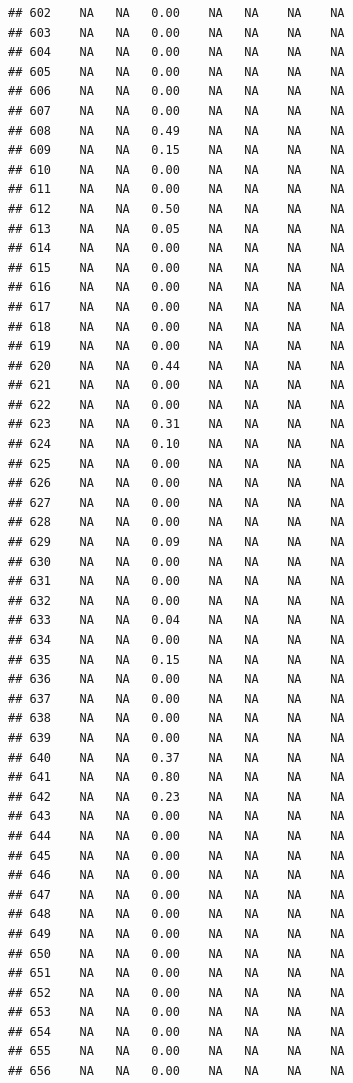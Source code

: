 \documentclass{article}\usepackage{graphicx, color}
\makeatletter
\newenvironment{kframe}{%
 \def\at@end@of@kframe{}%
 \ifinner\ifhmode%
  \def\at@end@of@kframe{\end{minipage}}%
  \begin{minipage}{\columnwidth}%
 \fi\fi%
 \def\FrameCommand##1{\hskip\@totalleftmargin \hskip-\fboxsep
 \colorbox{shadecolor}{##1}\hskip-\fboxsep
     \hskip-\linewidth \hskip-\@totalleftmargin \hskip\columnwidth}%
 \MakeFramed {\advance\hsize-\width
   \@totalleftmargin\z@ \linewidth\hsize
   \@setminipage}}%
 {\par\unskip\endMakeFramed%
 \at@end@of@kframe}
\newenvironment{knitrout}{}{} %
\makeatother
\begin{document}
\begin{knitrout}
\begin{kframe}
\begin{verbatim}
## 602    NA   NA   0.00    NA   NA    NA    NA
## 603    NA   NA   0.00    NA   NA    NA    NA
## 604    NA   NA   0.00    NA   NA    NA    NA
## 605    NA   NA   0.00    NA   NA    NA    NA
## 606    NA   NA   0.00    NA   NA    NA    NA
## 607    NA   NA   0.00    NA   NA    NA    NA
## 608    NA   NA   0.49    NA   NA    NA    NA
## 609    NA   NA   0.15    NA   NA    NA    NA
## 610    NA   NA   0.00    NA   NA    NA    NA
## 611    NA   NA   0.00    NA   NA    NA    NA
## 612    NA   NA   0.50    NA   NA    NA    NA
## 613    NA   NA   0.05    NA   NA    NA    NA
## 614    NA   NA   0.00    NA   NA    NA    NA
## 615    NA   NA   0.00    NA   NA    NA    NA
## 616    NA   NA   0.00    NA   NA    NA    NA
## 617    NA   NA   0.00    NA   NA    NA    NA
## 618    NA   NA   0.00    NA   NA    NA    NA
## 619    NA   NA   0.00    NA   NA    NA    NA
## 620    NA   NA   0.44    NA   NA    NA    NA
## 621    NA   NA   0.00    NA   NA    NA    NA
## 622    NA   NA   0.00    NA   NA    NA    NA
## 623    NA   NA   0.31    NA   NA    NA    NA
## 624    NA   NA   0.10    NA   NA    NA    NA
## 625    NA   NA   0.00    NA   NA    NA    NA
## 626    NA   NA   0.00    NA   NA    NA    NA
## 627    NA   NA   0.00    NA   NA    NA    NA
## 628    NA   NA   0.00    NA   NA    NA    NA
## 629    NA   NA   0.09    NA   NA    NA    NA
## 630    NA   NA   0.00    NA   NA    NA    NA
## 631    NA   NA   0.00    NA   NA    NA    NA
## 632    NA   NA   0.00    NA   NA    NA    NA
## 633    NA   NA   0.04    NA   NA    NA    NA
## 634    NA   NA   0.00    NA   NA    NA    NA
## 635    NA   NA   0.15    NA   NA    NA    NA
## 636    NA   NA   0.00    NA   NA    NA    NA
## 637    NA   NA   0.00    NA   NA    NA    NA
## 638    NA   NA   0.00    NA   NA    NA    NA
## 639    NA   NA   0.00    NA   NA    NA    NA
## 640    NA   NA   0.37    NA   NA    NA    NA
## 641    NA   NA   0.80    NA   NA    NA    NA
## 642    NA   NA   0.23    NA   NA    NA    NA
## 643    NA   NA   0.00    NA   NA    NA    NA
## 644    NA   NA   0.00    NA   NA    NA    NA
## 645    NA   NA   0.00    NA   NA    NA    NA
## 646    NA   NA   0.00    NA   NA    NA    NA
## 647    NA   NA   0.00    NA   NA    NA    NA
## 648    NA   NA   0.00    NA   NA    NA    NA
## 649    NA   NA   0.00    NA   NA    NA    NA
## 650    NA   NA   0.00    NA   NA    NA    NA
## 651    NA   NA   0.00    NA   NA    NA    NA
## 652    NA   NA   0.00    NA   NA    NA    NA
## 653    NA   NA   0.00    NA   NA    NA    NA
## 654    NA   NA   0.00    NA   NA    NA    NA
## 655    NA   NA   0.00    NA   NA    NA    NA
## 656    NA   NA   0.00    NA   NA    NA    NA

\end{verbatim}
\end{kframe}
\end{knitrout}
\end{document}
